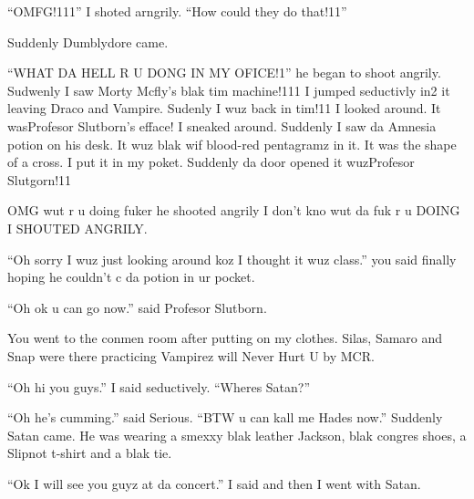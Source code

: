 \enquote{OMFG!111} I shoted arngrily. \enquote{How could they do that!11}

Suddenly Dumblydore came.

\enquote{WHAT DA HELL R U DONG IN MY OFICE!1} he began to shoot angrily. Sudwenly I saw Morty Mcfly's blak tim machine!111 I jumped seductivly in2 it leaving Draco and Vampire. Sudenly I wuz back in tim!11 I looked around. It was\dotfill\newline Profesor Slutborn's efface! I sneaked around. Suddenly I saw da Amnesia potion on his desk. It wuz blak wif blood-red pentagramz in it. It was the shape of a cross. I put it in my poket. Suddenly da door opened it wuz\dotfill Profesor Slutgorn!11

OMG wut r u doing fuker he shooted angrily I don't kno wut da fuk r u DOING I SHOUTED ANGRILY\@.

\enquote{Oh sorry I wuz just looking around koz I thought it wuz class.} you said finally hoping he couldn't c da potion in ur pocket.

\enquote{Oh ok u can go now.} said Profesor Slutborn.

You went to the conmen room after putting on my clothes. Silas, Samaro and Snap were there practicing Vampirez will Never Hurt U by MCR\@.

\enquote{Oh hi you guys.} I said seductively. \enquote{Wheres Satan?}

\enquote{Oh he's cumming.} said Serious. \enquote{BTW u can kall me Hades now.} Suddenly Satan came. He was wearing a smexxy blak leather Jackson, blak congres shoes, a Slipnot t-shirt and a blak tie.

\enquote{Ok I will see you guyz at da concert.} I said and then I went with Satan.
